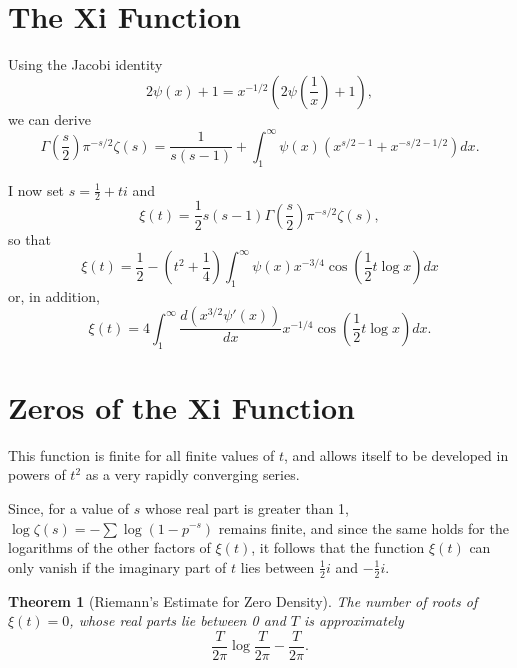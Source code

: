 \documentclass[12pt]{article}
\newtheorem{theorem}{Theorem}
\begin{document}
\section{The Xi Function}

Using the Jacobi identity
\begin{equation}
2\psi(x) + 1 = x^{-1/2} \left(2\psi\left(\frac{1}{x}\right) + 1\right),
\label{eq:jacobi_identity}
\end{equation}
we can derive
\begin{equation}
\Gamma\left(\frac{s}{2}\right) \pi^{-s/2} \zeta(s) = \frac{1}{s(s-1)} + \int_1^{\infty} \psi(x) \left(x^{s/2-1} + x^{-s/2-1/2}\right) dx.
\label{eq:zeta_symmetric_integral}
\end{equation}

I now set $s = \frac{1}{2} + ti$ and
\begin{equation}
\xi(t) = \frac{1}{2} s(s-1) \Gamma\left(\frac{s}{2}\right) \pi^{-s/2} \zeta(s),
\label{eq:xi_definition}
\end{equation}
so that
\begin{equation}
\xi(t) = \frac{1}{2} - \left(t^2 + \frac{1}{4}\right) \int_1^{\infty} \psi(x) x^{-3/4} \cos\left(\frac{1}{2}t \log x\right) dx
\label{eq:xi_integral}
\end{equation}
or, in addition,
\begin{equation}
\xi(t) = 4 \int_1^{\infty} \frac{d(x^{3/2}\psi'(x))}{dx} x^{-1/4} \cos\left(\frac{1}{2}t \log x\right) dx.
\label{eq:xi_derivative_form}
\end{equation}

\section{Zeros of the Xi Function}

This function is finite for all finite values of $t$, and allows itself to be developed in powers of $t^2$ as a very rapidly converging series.

Since, for a value of $s$ whose real part is greater than 1, $\log \zeta(s) = -\sum \log(1-p^{-s})$ remains finite, and since the same holds for the logarithms of the other factors of $\xi(t)$, it follows that the function $\xi(t)$ can only vanish if the imaginary part of $t$ lies between $\frac{1}{2}i$ and $-\frac{1}{2}i$.

\begin{theorem}[Riemann's Estimate for Zero Density]
The number of roots of $\xi(t) = 0$, whose real parts lie between 0 and $T$ is approximately
\begin{equation}
\frac{T}{2\pi} \log \frac{T}{2\pi} - \frac{T}{2\pi}.
\label{eq:zero_density}
\end{equation}
\end{theorem}
\end{document}
